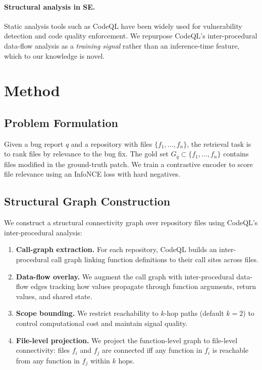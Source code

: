 \documentclass[11pt]{article}
\begin{document}
\paragraph{Structural analysis in SE.}
Static analysis tools such as CodeQL have been widely used for vulnerability detection and code quality enforcement.
We repurpose CodeQL's inter-procedural data-flow analysis as a \emph{training signal} rather than an inference-time feature, which to our knowledge is novel.

\section{Method}
\label{sec:method}

\subsection{Problem Formulation}

Given a bug report $q$ and a repository with files $\{f_1, \ldots, f_n\}$, the retrieval task is to rank files by relevance to the bug fix.
The gold set $G_q \subset \{f_1, \ldots, f_n\}$ contains files modified in the ground-truth patch.
We train a contrastive encoder to score file relevance using an InfoNCE loss with hard negatives.

\subsection{Structural Graph Construction}
\label{sec:struct}

We construct a structural connectivity graph over repository files using CodeQL's inter-procedural analysis:

\begin{enumerate}[nosep]
  \item \textbf{Call-graph extraction.} For each repository, CodeQL builds an inter-procedural call graph linking function definitions to their call sites across files.
  \item \textbf{Data-flow overlay.} We augment the call graph with inter-procedural data-flow edges tracking how values propagate through function arguments, return values, and shared state.
  \item \textbf{Scope bounding.} We restrict reachability to $k$-hop paths (default $k{=}2$) to control computational cost and maintain signal quality.
  \item \textbf{File-level projection.} We project the function-level graph to file-level connectivity: files $f_i$ and $f_j$ are connected iff any function in $f_i$ is reachable from any function in $f_j$ within $k$ hops.
\end{enumerate}
\end{document}
